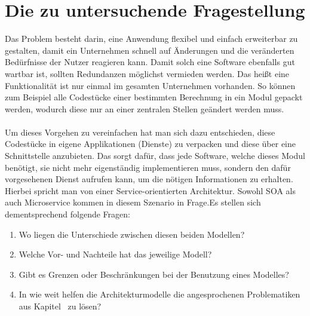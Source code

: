 \section{Die zu untersuchende Fragestellung}
\label{sec:dasProblem}
Das Problem besteht darin, eine Anwendung flexibel und einfach erweiterbar zu gestalten, damit ein Unternehmen schnell auf Änderungen und die veränderten Bedürfnisse der Nutzer reagieren kann. Damit solch eine Software ebenfalls gut wartbar ist, sollten Redundanzen möglichst vermieden werden. Das heißt eine Funktionalität ist nur einmal im gesamten Unternehmen vorhanden. So können zum Beispiel alle Codestücke einer bestimmten Berechnung in ein Modul gepackt werden, wodurch diese  nur an einer zentralen Stellen geändert werden muss.
\\\\
Um dieses Vorgehen zu vereinfachen hat man sich dazu entschieden, diese Codestücke in eigene Applikationen (Dienste) zu verpacken und diese über eine Schnittstelle anzubieten. Das sorgt dafür, dass jede Software, welche dieses Modul benötigt, sie nicht mehr eigenständig implementieren muss, sondern den dafür vorgesehenen Dienst aufrufen kann, um die nötigen Informationen zu erhalten. Hierbei spricht man von einer Service-orientierten Architektur. Sowohl SOA als auch Microservice kommen in diesem Szenario in Frage.Es stellen sich dementsprechend folgende Fragen:
\begin{enumerate}
    \item Wo liegen die Unterschiede zwischen diesen beiden Modellen?
    \item Welche Vor- und Nachteile hat das jeweilige Modell?
    \item Gibt es Grenzen oder Beschränkungen bei der Benutzung eines Modelles?
    \item In wie weit helfen die Architekturmodelle die angesprochenen Problematiken aus Kapitel \ zu lösen?
\end{enumerate}
     